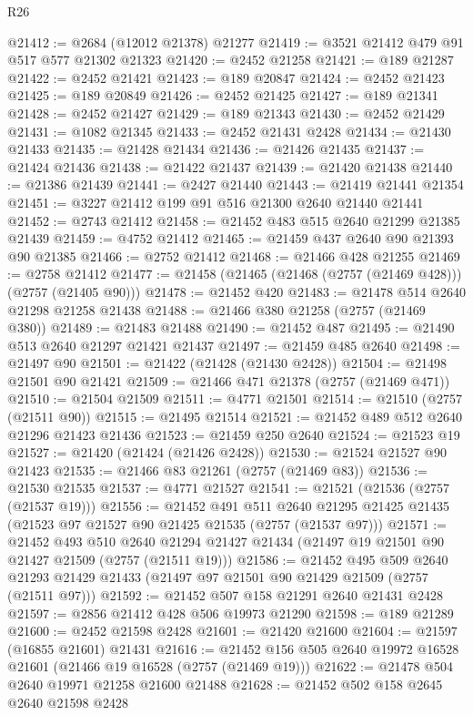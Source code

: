 \begin{lexlean}{R26}
\begin{coremodule}
@21412 := @2684 (@12012 @21378) @21277
@21419 := @3521 @21412 @479 @91 @517 @577 @21302 @21323
@21420 := @2452 @21258
@21421 := @189 @21287
@21422 := @2452 @21421
@21423 := @189 @20847
@21424 := @2452 @21423
@21425 := @189 @20849
@21426 := @2452 @21425
@21427 := @189 @21341
@21428 := @2452 @21427
@21429 := @189 @21343
@21430 := @2452 @21429
@21431 := @1082 @21345
@21433 := @2452 @21431 @2428
@21434 := @21430 @21433
@21435 := @21428 @21434
@21436 := @21426 @21435
@21437 := @21424 @21436
@21438 := @21422 @21437
@21439 := @21420 @21438
@21440 := @21386 @21439
@21441 := @2427 @21440
@21443 := @21419 @21441 @21354
@21451 := @3227 @21412 @199 @91 @516 @21300 @2640 @21440 @21441
@21452 := @2743 @21412
@21458 := @21452 @483 @515 @2640 @21299 @21385 @21439
@21459 := @4752 @21412
@21465 := @21459 @437 @2640 @90 @21393 @90 @21385
@21466 := @2752 @21412
@21468 := @21466 @428 @21255
@21469 := @2758 @21412
@21477 := @21458 (@21465 (@21468 (@2757 (@21469 @428))) (@2757 (@21405 @90)))
@21478 := @21452 @420
@21483 := @21478 @514 @2640 @21298 @21258 @21438
@21488 := @21466 @380 @21258 (@2757 (@21469 @380))
@21489 := @21483 @21488
@21490 := @21452 @487
@21495 := @21490 @513 @2640 @21297 @21421 @21437
@21497 := @21459 @485 @2640
@21498 := @21497 @90
@21501 := @21422 (@21428 (@21430 @2428))
@21504 := @21498 @21501 @90 @21421
@21509 := @21466 @471 @21378 (@2757 (@21469 @471))
@21510 := @21504 @21509
@21511 := @4771 @21501
@21514 := @21510 (@2757 (@21511 @90))
@21515 := @21495 @21514
@21521 := @21452 @489 @512 @2640 @21296 @21423 @21436
@21523 := @21459 @250 @2640
@21524 := @21523 @19
@21527 := @21420 (@21424 (@21426 @2428))
@21530 := @21524 @21527 @90 @21423
@21535 := @21466 @83 @21261 (@2757 (@21469 @83))
@21536 := @21530 @21535
@21537 := @4771 @21527
@21541 := @21521 (@21536 (@2757 (@21537 @19)))
@21556 := @21452
    @491
    @511
    @2640
    @21295
    @21425
    @21435
    (@21523 @97 @21527 @90 @21425 @21535 (@2757 (@21537 @97)))
@21571 := @21452
    @493
    @510
    @2640
    @21294
    @21427
    @21434
    (@21497 @19 @21501 @90 @21427 @21509 (@2757 (@21511 @19)))
@21586 := @21452
    @495
    @509
    @2640
    @21293
    @21429
    @21433
    (@21497 @97 @21501 @90 @21429 @21509 (@2757 (@21511 @97)))
@21592 := @21452 @507 @158 @21291 @2640 @21431 @2428
@21597 := @2856 @21412 @428 @506 @19973 @21290
@21598 := @189 @21289
@21600 := @2452 @21598 @2428
@21601 := @21420 @21600
@21604 := @21597 (@16855 @21601) @21431
@21616 := @21452 @156 @505 @2640 @19972 @16528 @21601 (@21466 @19 @16528 (@2757 (@21469 @19)))
@21622 := @21478 @504 @2640 @19971 @21258 @21600 @21488
@21628 := @21452 @502 @158 @2645 @2640 @21598 @2428

\end{coremodule}
\end{lexlean}
